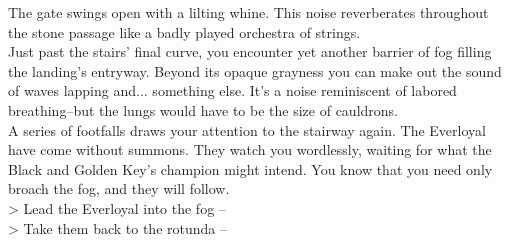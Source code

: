 The gate swings open with a lilting whine. This noise reverberates throughout the stone passage like a badly played orchestra of strings.\\

Just past the stairs' final curve, you encounter yet another barrier of fog filling the landing's entryway. Beyond its opaque grayness you can make out the sound of waves lapping and... something else. It's a noise reminiscent of labored breathing--but the lungs would have to be the size of cauldrons.\\

A series of footfalls draws your attention to the stairway again. The Everloyal have come without summons. They watch you wordlessly, waiting for what the Black and Golden Key's champion might intend. You know that you need only broach the fog, and they will follow.\\

> Lead the Everloyal into the fog -- \\
> Take them back to the rotunda -- 